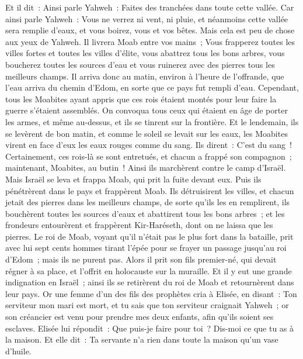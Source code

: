 \begin{multicols}{2}
Et il dit~: Ainsi parle Yahweh~: Faites des tranchées dans toute cette vallée.
Car ainsi parle Yahweh~: Vous ne verrez ni vent, ni pluie, et néanmoins cette vallée sera remplie d'eaux, et vous boirez, vous et vos bêtes.
Mais cela est peu de chose aux yeux de Yahweh. Il livrera Moab entre vos mains~;
Vous frapperez toutes les villes fortes et toutes les villes d'élite, vous abattrez tous les bons arbres, vous boucherez toutes les sources d'eau et vous ruinerez avec des pierres tous les meilleurs champs.
Il arriva donc au matin, environ à l'heure de l'offrande, que l'eau arriva du chemin d'Edom, en sorte que ce pays fut rempli d'eau.
Cependant, tous les Moabites ayant appris que ces rois étaient montés pour leur faire la guerre s'étaient assemblés. On convoqua tous ceux qui étaient en âge de porter les armes, et même au-dessus, et ils se tinrent sur la frontière.
Et le lendemain, ils se levèrent de bon matin, et comme le soleil se levait sur les eaux, les Moabites virent en face d'eux les eaux rouges comme du sang.
Ils dirent~: C'est du sang~! Certainement, ces rois-là se sont entretués, et chacun a frappé son compagnon~; maintenant, Moabites, au butin~!
Ainsi ils marchèrent contre le camp d'Israël. Mais Israël se leva et frappa Moab, qui prit la fuite devant eux. Puis ils pénétrèrent dans le pays et frappèrent Moab.
Ils détruisirent les villes, et chacun jetait des pierres dans les meilleurs champs, de sorte qu'ils les en remplirent, ils bouchèrent toutes les sources d'eaux et abattirent tous les bons arbres~; et les frondeurs entourèrent et frappèrent Kir-Haréseth, dont on ne laissa que les pierres.
Le roi de Moab, voyant qu'il n'était pas le plus fort dans la bataille, prit avec lui sept cents hommes tirant l'épée pour se frayer un passage jusqu'au roi d'Edom~; mais ils ne purent pas.
Alors il prit son fils premier-né, qui devait régner à sa place, et l'offrit en holocauste sur la muraille. Et il y eut une grande indignation en Israël~; ainsi ils se retirèrent du roi de Moab et retournèrent dans leur pays.
\VerseOne{}Or une femme d'un des fils des prophètes cria à Elisée, en disant~: Ton serviteur mon mari est mort, et tu sais que ton serviteur craignait Yahweh~; or son créancier est venu pour prendre mes deux enfants, afin qu'ils soient ses esclaves.
Elisée lui répondit~: Que puis-je faire pour toi~? Dis-moi ce que tu as à la maison. Et elle dit~: Ta servante n'a rien dans toute la maison qu'un vase d'huile.

\end{multicols}
